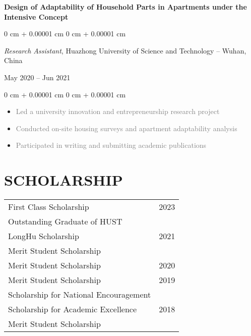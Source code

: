 \documentclass[10pt, letterpaper]{article}
\newenvironment{highlights}{
    \begin{itemize}[
        topsep=0.10 cm,
        parsep=0.10 cm,
        partopsep=0pt,
        itemsep=0pt,
        leftmargin=0 cm + 10pt
    ]
}{
    \end{itemize}
} %
\newenvironment{onecolentry}{
    \begin{adjustwidth}{
        0 cm + 0.00001 cm
    }{
        0 cm + 0.00001 cm
    }
}{
    \end{adjustwidth}
} %
\newenvironment{twocolentry}[2][]{
    \onecolentry
    \def\secondColumn{#2}
    \setcolumnwidth{\fill, 4.5 cm}
    \begin{paracol}{2}
}{
    \switchcolumn \raggedleft \secondColumn
    \end{paracol}
    \endonecolentry
} %
\begin{document}
    \textbf{Design of Adaptability of Household Parts in Apartments under the Intensive Concept} \\
    \begin{twocolentry}{
    May 2020 – Jun 2021
    }
    \textit{Research Assistant}, Huazhong University of Science and Technology -- Wuhan, China
    \end{twocolentry}
    
    \vspace{0.10 cm}
    \begin{onecolentry}
    \begin{highlights}
        \item \textcolor{gray}{Led a university innovation and entrepreneurship research project}
        \item \textcolor{gray}{Conducted on-site housing surveys and apartment adaptability analysis}
        \item \textcolor{gray}{Participated in writing and submitting academic publications}
    \end{highlights}
    \end{onecolentry}


    \section{SCHOLARSHIP}
    
    \vspace{0.2em}
    \begin{tabularx}{\linewidth}{@{}Xr@{}}
    First Class Scholarship & 2023 \\
    Outstanding Graduate of HUST &  \\
    LongHu Scholarship & 2021 \\
    Merit Student Scholarship &  \\
    Merit Student Scholarship & 2020 \\
    Merit Student Scholarship & 2019 \\
    Scholarship for National Encouragement &  \\
    Scholarship for Academic Excellence & 2018 \\
    Merit Student Scholarship &  \\
    \end{tabularx}
    
\end{document}
